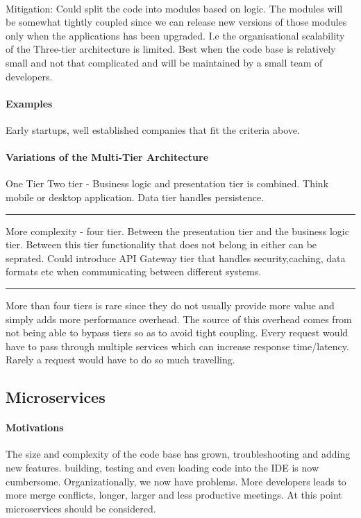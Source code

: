 \documentclass[a4paper, 11pt]{book}
\begin{document}
    \paragraph{}
    Mitigation: Could split the code into modules based on logic.
    The modules will be somewhat tightly coupled since we can release new versions of those modules only when the applications has been upgraded.
    I.e the organisational scalability of the Three-tier architecture is limited.
    Best when the code base is relatively small and not that complicated and will be maintained by a small team of developers.

    \paragraph{Examples}
    Early startups, well established companies that fit the criteria above.

    \paragraph{Variations of the Multi-Tier Architecture}
    One Tier
    Two tier - Business logic and presentation tier is combined.
    Think mobile or desktop application.
    Data tier handles persistence.

    \hrule
    More complexity - four tier.
    Between the presentation tier and the business logic tier.
    Between this tier functionality that does not belong in either can be seprated.
    Could introduce API Gateway tier that handles security,caching, data formats etc when communicating between different systems.

    \hrule
    More than four tiers is rare since they do not usually provide more value and simply adds more performance overhead.
    The source of this overhead comes from not being able to bypass tiers so as to avoid tight coupling.
    Every request would have to pass through multiple services which can increase response time/latency.
    Rarely a request would have to do so much travelling.

    \subsection{Microservices}

    \paragraph{Motivations}
    The size and complexity of the code base has grown, troubleshooting and adding new features.
    building, testing and even loading code into the IDE is now cumbersome.
    Organizationally, we now have problems.
    More developers leads to more merge conflicts, longer, larger and less productive meetings.
    At this point microservices should be considered.
\end{document}
